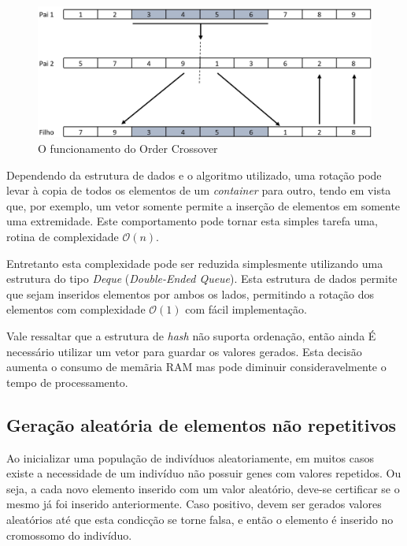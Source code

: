 \documentclass[12pt]{article}
\begin{document}
\begin{figure}[ht]
\centering
\includegraphics[width=.8\textwidth]{order_crossover.jpg}
\caption{O funcionamento do Order Crossover}
\label{fig:orderCrossover}
\end{figure}

Dependendo da estrutura de dados e o algoritmo utilizado, uma rota\c{c}\~{a}o pode levar \`{a}
copia de todos os elementos de um \textit{container} para outro, tendo em vista que, por exemplo,
um vetor somente permite a inser\c{c}\~{a}o de elementos em somente uma extremidade. Este
comportamento pode tornar esta simples tarefa uma, rotina de complexidade $\mathcal{O}(n)$.

Entretanto esta complexidade pode ser reduzida simplesmente utilizando uma estrutura do tipo
\textit{Deque} (\textit{Double-Ended Queue}). Esta estrutura de dados permite que sejam inseridos
elementos por ambos os lados, permitindo a rota\c{c}\~{a}o dos elementos com complexidade
$\mathcal{O}(1)$ com f\'{a}cil implementa\c{c}\~{a}o.

Vale ressaltar que a estrutura de \textit{hash} n\~{a}o suporta ordena\c{c}\~{a}o, ent\~{a}o
ainda \'{E} necess\'{a}rio utilizar um vetor para guardar os valores gerados. Esta decis\~{a}o
aumenta o consumo de mem\~{a}ria RAM mas pode diminuir consideravelmente o tempo de processamento.

\subsection{Gera\c{c}\~{a}o aleat\'{o}ria de elementos n\~{a}o repetitivos}\label{sec:nonRepeating}

Ao inicializar uma popula\c{c}\~{a}o de indiv\'{i}duos aleatoriamente, em muitos casos existe
a necessidade de um indiv\'{i}duo n\~{a}o possuir genes com valores repetidos. Ou seja, a cada novo
elemento inserido com um valor aleat\'{o}rio, deve-se certificar se o mesmo j\'{a} foi inserido
anteriormente. Caso positivo, devem ser gerados valores aleat\'{o}rios at\'{e} que esta
condic\c{c}\~{a}o se torne falsa, e ent\~{a}o o elemento \'{e} inserido no cromossomo do indiv\'{i}duo.
\end{document}
